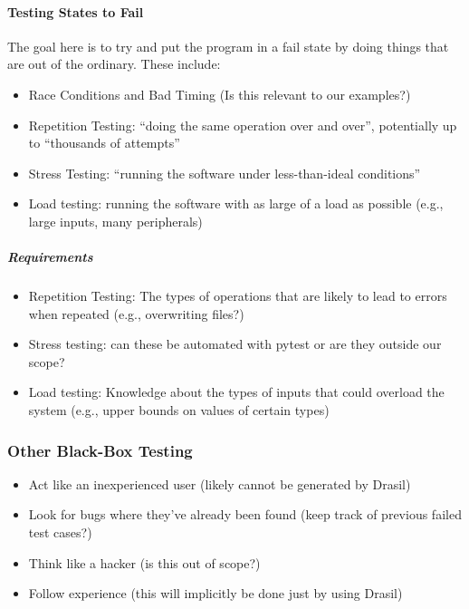 \paragraph{Testing States to Fail \cite[p.~84-87]{patton_software_2006}}

The goal here is to try and put the program in a fail state by doing things
that are out of the ordinary. These include:

\begin{itemize}
      \item Race Conditions and Bad Timing \cite[p.~85-86]{patton_software_2006}
            (Is this relevant to our examples?)
      \item Repetition Testing: ``doing the same operation over and over'',
            potentially up to ``thousands of attempts''
            \cite[p.~86]{patton_software_2006}
      \item Stress Testing: ``running the software under less-than-ideal
            conditions'' \cite[p.~86]{patton_software_2006}
      \item Load testing: running the software with as large of a load as
            possible (e.g., large inputs, many peripherals)
            \cite[p.~86]{patton_software_2006}
\end{itemize}

\subparagraph{Requirements}
\begin{itemize}
      \item Repetition Testing: The types of operations that are likely to lead
            to errors when repeated (e.g., overwriting files?)
      \item Stress testing: can these be automated with pytest or are they
            outside our scope? 
      \item Load testing: Knowledge about the types of inputs that could
            overload the system (e.g., upper bounds on values of certain types)
\end{itemize}

\subsubsection{Other Black-Box Testing \cite[p.~87-89]{patton_software_2006}}
\begin{itemize}
      \item Act like an inexperienced user (likely cannot be generated by Drasil)
      \item Look for bugs where they've already been found (keep track of
            previous failed test cases?)
      \item Think like a hacker (is this out of scope?)
      \item Follow experience (this will implicitly be done just by using Drasil)
\end{itemize}

